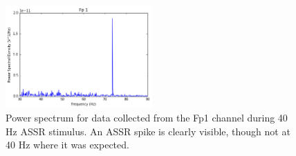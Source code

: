 \documentclass[letterpaper,twocolumn,10pt]{article}
\begin{document}
\begin{figure}[h]
\centering
\includegraphics[width=0.5\textwidth]{figures/001_ASSR_Fp1.jpg}
\caption{Power spectrum for data collected from the Fp1 channel during 40 Hz ASSR stimulus. An ASSR spike is clearly visible, though not at 40 Hz where it was expected.}
\end{figure}
\end{document}

